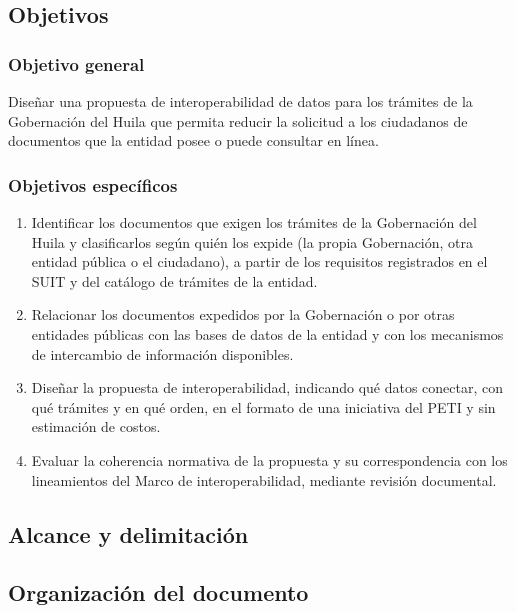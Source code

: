 \subsection{Objetivos}


\subsubsection{Objetivo general}

Diseñar una propuesta de interoperabilidad de datos para los trámites de la Gobernación del Huila que permita reducir la solicitud a los ciudadanos de documentos que la entidad posee o puede consultar en línea.

\subsubsection{Objetivos específicos}

\begin{enumerate}
\item Identificar los documentos que exigen los trámites de la Gobernación del Huila y clasificarlos según quién los expide (la propia Gobernación, otra entidad pública o el ciudadano), a partir de los requisitos registrados en el SUIT y del catálogo de trámites de la entidad.

\item Relacionar los documentos expedidos por la Gobernación o por otras entidades públicas con las bases de datos de la entidad y con los mecanismos de intercambio de información disponibles.

\item Diseñar la propuesta de interoperabilidad, indicando qué datos conectar, con qué trámites y en qué orden, en el formato de una iniciativa del PETI y sin estimación de costos.

\item Evaluar la coherencia normativa de la propuesta y su correspondencia con los lineamientos del Marco de interoperabilidad, mediante revisión documental.

\end{enumerate}
\subsection{Alcance y delimitación}


\subsection{Organización del documento}

